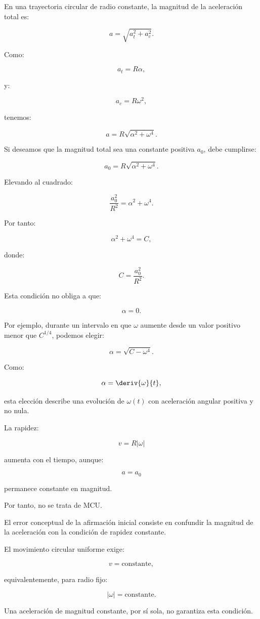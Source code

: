 \begin{explicacion}
En una trayectoria circular de radio constante, la magnitud
de la aceleración total es:

\[
a=\sqrt{a_t^2+a_c^2}.
\]

Como:

\[
a_t=R\alpha,
\]

y:

\[
a_c=R\omega^2,
\]

tenemos:

\[
a=R\sqrt{\alpha^2+\omega^4}.
\]

Si deseamos que la magnitud total sea una constante positiva
\(a_0\), debe cumplirse:

\[
a_0=R\sqrt{\alpha^2+\omega^4}.
\]

Elevando al cuadrado:

\[
\frac{a_0^2}{R^2}=\alpha^2+\omega^4.
\]

Por tanto:

\[
\boxed{
\alpha^2+\omega^4=C
},
\]

donde:

\[
C=\frac{a_0^2}{R^2}.
\]

Esta condición no obliga a que:

\[
\alpha=0.
\]

Por ejemplo, durante un intervalo en que \(\omega\) aumente
desde un valor positivo menor que \(C^{1/4}\), podemos elegir:

\[
\alpha=\sqrt{C-\omega^4}.
\]

Como:

\[
\alpha=\deriv{\omega}{t},
\]

esta elección describe una evolución de \(\omega(t)\) con
aceleración angular positiva y no nula.

La rapidez:

\[
v=R|\omega|
\]

aumenta con el tiempo, aunque:

\[
a=a_0
\]

permanece constante en magnitud.

Por tanto, no se trata de MCU.

El error conceptual de la afirmación inicial consiste en
confundir la magnitud de la aceleración con la condición
de rapidez constante.

El movimiento circular uniforme exige:

\[
v=\text{constante},
\]

equivalentemente, para radio fijo:

\[
|\omega|=\text{constante}.
\]

Una aceleración de magnitud constante, por sí sola, no
garantiza esta condición.
\end{explicacion}